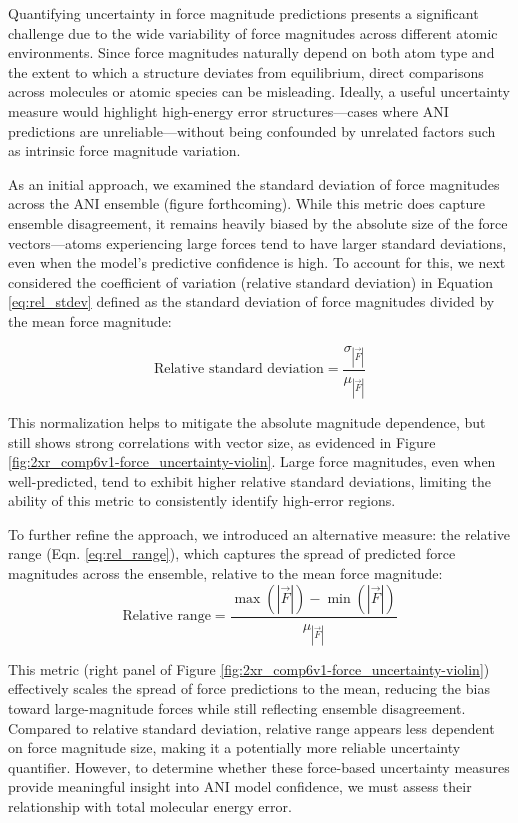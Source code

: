 Quantifying uncertainty in force magnitude predictions presents a significant challenge due to the wide variability of force magnitudes across different atomic environments. Since force magnitudes naturally depend on both atom type and the extent to which a structure deviates from equilibrium, direct comparisons across molecules or atomic species can be misleading. Ideally, a useful uncertainty measure would highlight high-energy error structures—cases where ANI predictions are unreliable—without being confounded by unrelated factors such as intrinsic force magnitude variation.

As an initial approach, we examined the standard deviation of force magnitudes across the ANI ensemble (figure forthcoming). While this metric does capture ensemble disagreement, it remains heavily biased by the absolute size of the force vectors—atoms experiencing large forces tend to have larger standard deviations, even when the model’s predictive confidence is high. To account for this, we next considered the coefficient of variation (relative standard deviation) in Equation \ref{eq:rel_stdev} defined as the standard deviation of force magnitudes divided by the mean force magnitude:

\begin{equation} 
\text{Relative standard deviation} = \frac{\sigma_{|\vec{F}|}}{\mu_{|\vec{F}|}}
\label{eq:rel_stdev}
\end{equation}

This normalization helps to mitigate the absolute magnitude dependence, but still shows strong correlations with vector size, as evidenced in Figure \ref{fig:2xr_comp6v1-force_uncertainty-violin}. Large force magnitudes, even when well-predicted, tend to exhibit higher relative standard deviations, limiting the ability of this metric to consistently identify high-error regions.

To further refine the approach, we introduced an alternative measure: the relative range (Eqn. \ref{eq:rel_range}), which captures the spread of predicted force magnitudes across the ensemble, relative to the mean force magnitude:
\begin{equation} 
\text{Relative range} = 
\frac{\max \left( |\vec{F}| \right) - \min \left( |\vec{F}| \right)}
                            {\mu_{|\vec{F}|}} 
\label{eq:rel_range}
\end{equation}

This metric (right panel of Figure \ref{fig:2xr_comp6v1-force_uncertainty-violin}) effectively scales the spread of force predictions to the mean, reducing the bias toward large-magnitude forces while still reflecting ensemble disagreement. Compared to relative standard deviation, relative range appears less dependent on force magnitude size, making it a potentially more reliable uncertainty quantifier.
However, to determine whether these force-based uncertainty measures provide meaningful insight into ANI model confidence, we must assess their relationship with total molecular energy error. 

